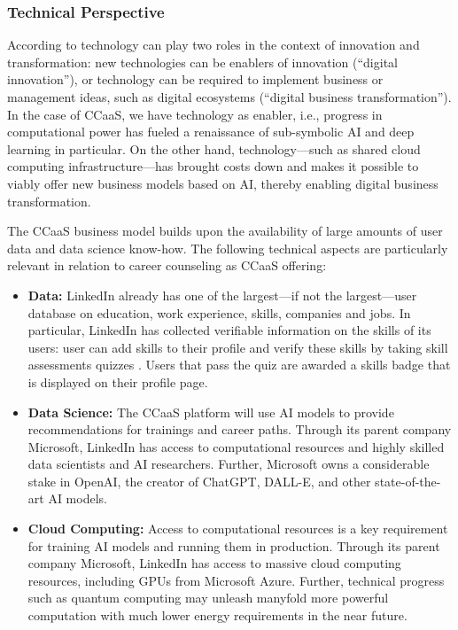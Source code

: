 \subsubsection{Technical Perspective}

According to \cite{dornbergerDigitalInnovationDigital2021} technology can play two roles in the context of innovation
and transformation: new technologies can be enablers of innovation (``digital innovation''), or technology can be 
required to implement business or management ideas, such as digital ecosystems (``digital business transformation'').
In the case of CCaaS, we have technology as enabler, i.e., progress in computational power has fueled a renaissance
of sub-symbolic AI and deep learning in particular. On the other hand, technology---such as shared cloud computing
infrastructure---has brought costs down and makes it possible to viably offer new business models based on AI,
thereby enabling digital business transformation.

The CCaaS business model builds upon the availability of large amounts of user data and data science know-how.
The following technical aspects are particularly relevant in relation to career counseling as CCaaS offering:

\begin{itemize}
    \item \textbf{Data:} LinkedIn already has one of the largest---if not the largest---user database 
        on education, work experience, skills, companies and jobs. In particular, LinkedIn has collected
        verifiable information on the skills of its users: user can add skills to their profile and
        verify these skills by taking skill assessments quizzes \citep{kaserAIpoweredCareerCounseling2023}.
        Users that pass the quiz are awarded a skills badge that is displayed on their profile page.
    \item \textbf{Data Science:} The CCaaS platform will use AI models to provide
        recommendations for trainings and career paths. Through its parent company Microsoft,
        LinkedIn has access to computational resources and highly skilled data scientists and AI 
        researchers. Further, Microsoft owns a considerable stake in OpenAI, the creator of 
        ChatGPT, DALL-E, and other state-of-the-art AI models.
    \item \textbf{Cloud Computing:} Access to computational resources is a key requirement for training
        AI models and running them in production. Through its parent company Microsoft, LinkedIn has
        access to massive cloud computing resources, including GPUs from Microsoft Azure. Further,
        technical progress such as quantum computing may unleash manyfold more powerful computation 
        with much lower energy requirements in the near future.
\end{itemize}



